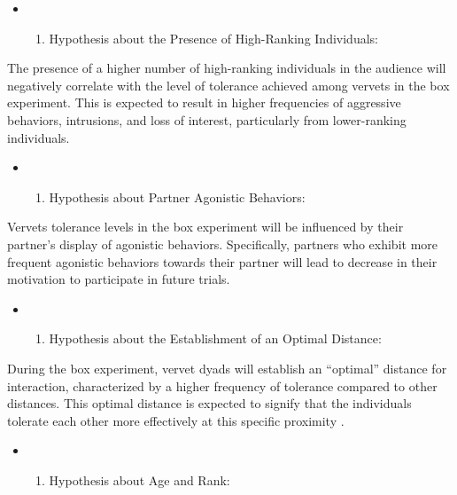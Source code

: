 \documentclass[
]{article}
\providecommand{\tightlist}{%
  \setlength{\itemsep}{0pt}\setlength{\parskip}{0pt}}
\begin{document}
\begin{itemize}
\item
  \begin{enumerate}
  \def\labelenumi{\arabic{enumi}.}
  \tightlist
  \item
    Hypothesis about the Presence of High-Ranking Individuals:
  \end{enumerate}
\end{itemize}

The presence of a higher number of high-ranking individuals in the
audience will negatively correlate with the level of tolerance achieved
among vervets in the box experiment. This is expected to result in
higher frequencies of aggressive behaviors, intrusions, and loss of
interest, particularly from lower-ranking individuals.

\begin{itemize}
\item
  \begin{enumerate}
  \def\labelenumi{\arabic{enumi}.}
  \setcounter{enumi}{1}
  \tightlist
  \item
    Hypothesis about Partner Agonistic Behaviors:
  \end{enumerate}
\end{itemize}

Vervets tolerance levels in the box experiment will be influenced by
their partner's display of agonistic behaviors. Specifically, partners
who exhibit more frequent agonistic behaviors towards their partner will
lead to decrease in their motivation to participate in future trials.

\begin{itemize}
\item
  \begin{enumerate}
  \def\labelenumi{\arabic{enumi}.}
  \setcounter{enumi}{2}
  \tightlist
  \item
    Hypothesis about the Establishment of an Optimal Distance:
  \end{enumerate}
\end{itemize}

During the box experiment, vervet dyads will establish an ``optimal''
distance for interaction, characterized by a higher frequency of
tolerance compared to other distances. This optimal distance is expected
to signify that the individuals tolerate each other more effectively at
this specific proximity .

\begin{itemize}
\item
  \begin{enumerate}
  \def\labelenumi{\arabic{enumi}.}
  \setcounter{enumi}{3}
  \tightlist
  \item
    Hypothesis about Age and Rank:
  \end{enumerate}
\end{itemize}
\end{document}
